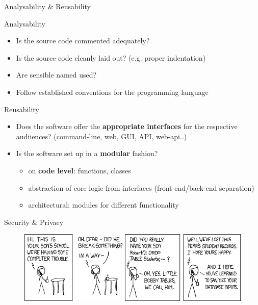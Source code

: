\documentclass[compress]{beamer}
\begin{document}
\begin{frame}{Analysability \& Reusability}

    \begin{block}{Analysability}
        \begin{itemize}
        \item Is the source code commented adequately?
        \item Is the source code cleanly laid out? (e.g. proper indentation)
        \item Are sensible named used?
        \item Follow established conventions for the programming language
        \end{itemize}
    \end{block}

    \begin{block}{Reusability}
        \begin{itemize}
            \item Does the software offer the \textbf{appropriate interfaces} for the
                respective audiiences? (command-line, web, GUI, API, web-api..)
            \item Is the software set up in a \textbf{modular} fashion?
            \begin{itemize}
                \item on \textbf{code level}: functions, classes
                \item abstraction of core logic from interfaces  (front-end/back-end separation)
                \item architectural: modules for different functionality
            \end{itemize}
        \end{itemize}
    \end{block}
\end{frame}

\begin{frame}{Security \& Privacy}
\begin{figure}
\includegraphics[width=12cm]{img/bobbytables.png}
\end{figure}
\end{frame}
\end{document}
